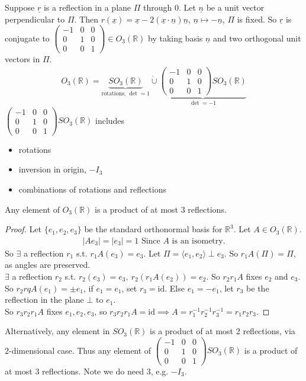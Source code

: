 Suppose $\underline{r}$ is a reflection in a plane $\Pi$ through 0.
Let $\underline{n}$ be a unit vector perpendicular to $\Pi$.
Then $r(\underline{x}) = \underline{x} - 2 (\underline{x} \cdot \underline{n}) \underline{n}$, $\underline{n} \mapsto - \underline{n}$, $\Pi$ is fixed.
So $\underline{r}$ is conjugate to $\begin{pmatrix}-1 & 0 & 0 \\0 & 1 & 0 \\0 & 0 & 1\end{pmatrix} \in O_3(\mathbb{R})$ by taking basis $\underline{n}$ and two orthogonal unit vectors in $\Pi$.
\begin{align*}
    O_3(\mathbb{R}) = \underbrace{SO_3(\mathbb{R})}_\text{rotations, $\det = 1$} \mathbin{\dot{\cup}} \underbrace{\begin{pmatrix}-1 & 0 & 0 \\0 & 1 & 0 \\0 & 0 & 1\end{pmatrix} SO_3(\mathbb{R})}_{\det = -1}
\end{align*} 
$\begin{pmatrix}-1 & 0 & 0 \\0 & 1 & 0 \\0 & 0 & 1\end{pmatrix} SO_3(\mathbb{R})$ includes
\begin{itemize}
    \item rotations
    \item inversion in origin, $-I_3$
    \item combinations of rotations and reflections
\end{itemize} 

\begin{theorem}\label{thm:13}
    Any element of $O_3(\mathbb{R})$ is a product of at most 3 reflections.
\end{theorem} 

\begin{proof}
    Let $\{e_1, e_2, e_3\}$ be the standard orthonormal basis for $\mathbb{R}^3$.
    Let $A \in O_3(\mathbb{R})$.
    \begin{align*}
        |A e_3| = |e_3| = 1 \text{ Since $A$ is an isometry.}
    \end{align*} 
    So $\exists$ a reflection $r_1$ s.t. $r_1 A(e_3) = e_3$.
    Let $\Pi = \langle e_1, e_2 \rangle \mathbin{\bot} e_3$.
    So $r_1 A(\Pi) = \Pi$, as angles are preserved. \\
    $\exists$ a reflection $r_2$ s.t. $r_2(e_3) = e_3,\ r_2(r_1 A (e_2)) = e_2$.
    So $r_2 r_1 A$ fixes $e_2$ and $e_3$. \\
    So $r_2 rq A (e_1) = \pm e_1$, if $e_1 = e_1$, set $r_3 = \text{id}$.
    Else $e_1 = - e_1$, let $r_3$ be the reflection in the plane $\bot$ to $e_1$. \\
    So $r_3 r_2 r_1 A$ fixes $e_1, e_2, e_3$, so $r_3 r_2 r_1 A = \text{id} \implies A = r_1^{-1} r_2^{-1} r_3^{-1} = r_1 r_2 r_3$.
\end{proof} 

Alternatively, any element in $SO_3(\mathbb{R})$ is a product of at most 2 reflections, via 2-dimensional case.
Thus any element of $\begin{pmatrix}-1 & 0 & 0 \\0 & 1 & 0 \\0 & 0 & 1\end{pmatrix} SO_3(\mathbb{R})$ is a product of at most 3 reflections.
Note we do need $3$, e.g. $-I_3$.